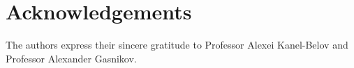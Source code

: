 \section*{Acknowledgements}
The authors express their sincere gratitude to Professor Alexei Kanel-Belov
and Professor Alexander Gasnikov.
